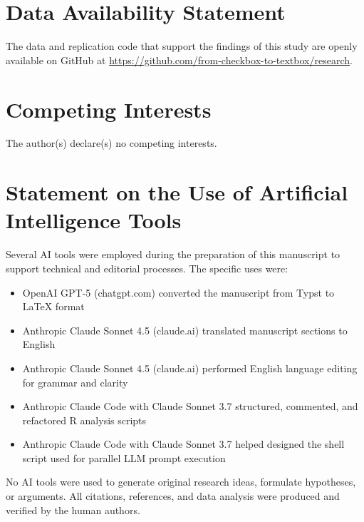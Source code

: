 \section*{Data Availability Statement}
The data and replication code that support the findings of this study are openly available on GitHub at \url{https://github.com/from-checkbox-to-textbox/research}.

\section*{Competing Interests}
The author(s) declare(s) no competing interests.

\section*{Statement on the Use of Artificial Intelligence Tools}

Several AI tools were employed during the preparation of this manuscript to support technical and editorial processes. The specific uses were:

\begin{itemize}
    \item OpenAI GPT-5 (chatgpt.com) converted the manuscript from Typst to LaTeX format
    \item Anthropic Claude Sonnet 4.5 (claude.ai) translated manuscript sections to English
    \item Anthropic Claude Sonnet 4.5 (claude.ai) performed English language editing for grammar and clarity
    \item Anthropic Claude Code with Claude Sonnet 3.7 structured, commented, and refactored R analysis scripts
    \item Anthropic Claude Code with Claude Sonnet 3.7 helped designed the shell script used for parallel LLM prompt execution
\end{itemize}

No AI tools were used to generate original research ideas, formulate hypotheses, or arguments. All citations, references, and data analysis were produced and verified by the human authors. 
